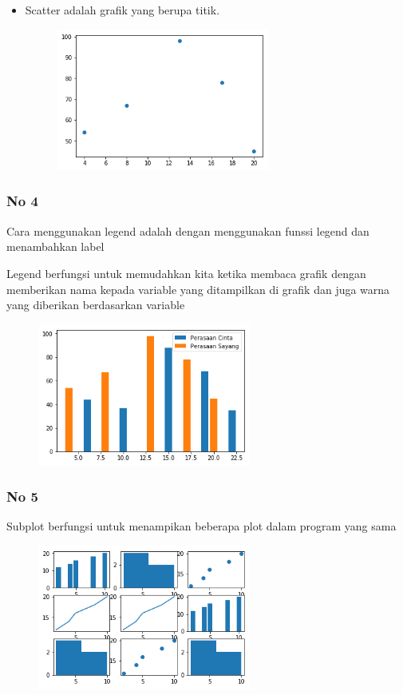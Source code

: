 \begin{itemize}
\item Scatter adalah grafik yang berupa titik.

\begin{figure}[H]
\centering
\includegraphics[width=7cm]{figures/6/1174071/Teori/scatter.png}
\end{figure}
\end{itemize}

\subsubsection{No 4}
Cara menggunakan legend adalah dengan menggunakan funssi legend dan menambahkan label
 
Legend berfungsi untuk memudahkan kita ketika membaca grafik dengan memberikan nama kepada variable yang ditampilkan di grafik dan juga warna yang diberikan berdasarkan variable
\begin{figure}[H]
\centering
\includegraphics[width=7cm]{figures/6/1174071/Teori/legend.png}
\end{figure}

\subsubsection{No 5}
Subplot berfungsi untuk menampikan beberapa plot dalam program yang sama

\begin{figure}[H]
\centering
\includegraphics[width=7cm]{figures/6/1174071/Teori/subplot.png}
\end{figure}


